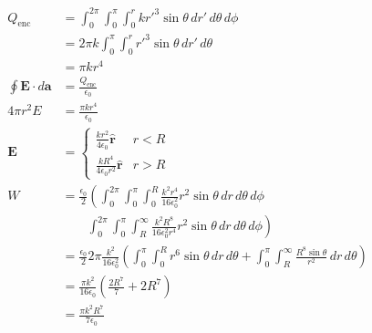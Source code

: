 \documentclass{article}
\renewcommand{\vec}[1]{\boldsymbol{\mathbf{#1}}}
\newcommand{\uvec}[1]{\hat{\vec{#1}}}
\begin{document}
\begin{align*}
  Q_\text{enc}                  & = \int_0^{2 \pi} \int_0^\pi \int_0^r k r'^3 \sin \theta \,d r' \,d \theta \,d \phi                                                                                                                   \\
                                & = 2 \pi k \int_0^\pi \int_0^r r'^3 \sin \theta \,d r' \,d \theta                                                                                                                                     \\
                                & = \pi k r^4                                                                                                                                                                                          \\
  \oint \vec{E} \cdot d \vec{a} & = \frac{Q_\text{enc}}{\epsilon_0}                                                                                                                                                                    \\
  4 \pi r^2 E                   & = \frac{\pi k r^4}{\epsilon_0}                                                                                                                                                                       \\
  \vec{E}                       & = \begin{cases}
                                      \frac{k r^2}{4 \epsilon_0} \uvec{r}     & r < R \\
                                      \frac{k R^4}{4 \epsilon_0 r^2} \uvec{r} & r > R
                                    \end{cases}                                                                                                                                                    \\
  W                             & = \frac{\epsilon_0}{2} \left( \int_0^{2 \pi} \int_0^\pi \int_0^R \frac{k^2 r^4}{16 \epsilon_0^2} r^2 \sin \theta \,d r \,d \theta \,d \phi \right.                                                   \\
                                & \qquad \left. \int_0^{2 \pi} \int_0^\pi \int_R^\infty \frac{k^2 R^8}{16 \epsilon_0^2 r^4} r^2 \sin \theta \,d r \,d \theta \,d \phi \right)                                                          \\
                                & = \frac{\epsilon_0}{2} 2 \pi \frac{k^2}{16 \epsilon_0^2} \left( \int_0^\pi \int_0^R r^6 \sin \theta \,d r \,d \theta + \int_0^\pi \int_R^\infty \frac{R^8 \sin \theta}{r^2} \,d r \,d \theta \right) \\
                                & = \frac{\pi k^2}{16 \epsilon_0} \left( \frac{2 R^7}{7} + 2 R^7 \right)                                                                                                                               \\
                                & = \frac{\pi k^2 R^7}{7 \epsilon_0}
\end{align*}
\end{document}
